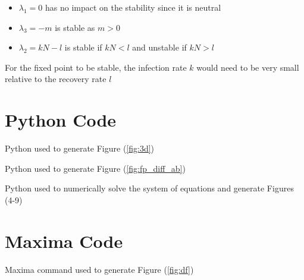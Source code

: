 \documentclass[a4paper]{article}
\begin{document}
\begin{itemize}
 \item $\lambda_{1} = 0$ has no impact on the stability since it is neutral
 \item $\lambda_{3} = -m$ is stable as $m > 0$
 \item $\lambda_{2} = kN - l$ is stable if $kN < l$ and unstable if $kN > l$
\end{itemize}

For the fixed point to be stable, the infection rate $k$ would need to be very small relative to the recovery rate $l$

\begin{appendix}
   \newpage
   \addappheadtotoc
   \appendixpage
   \section{Python Code}
   \sloppy
   Python used to generate Figure (\ref{fig:3d})
   
   Python used to generate Figure (\ref{fig:fp_diff_ab})
   
   Python used to numerically solve the system of equations and generate Figures (4-9)
   
   \section{Maxima Code}
   \sloppy
   Maxima command used to generate Figure (\ref{fig:df})
   
\end{appendix}
\end{document}
